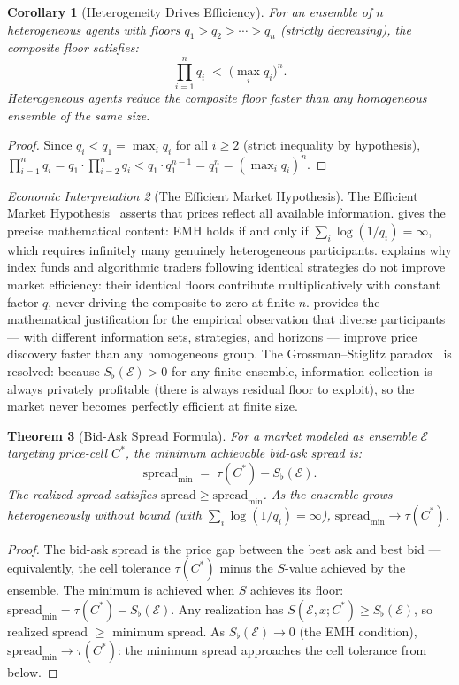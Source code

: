 \documentclass[twocolumn,11pt,a4paper]{article}
\newtheorem{theorem}{Theorem}[section]
\newtheorem{corollary}[theorem]{Corollary}
\theoremstyle{remark}
\newtheorem{econinterp}[theorem]{Economic Interpretation}
\newcommand{\Sflat}{S_{\flat}}
\newcommand{\tol}{\tau}
\newcommand{\Ens}{\mathcal{E}}            %
\begin{document}
\begin{corollary}[Heterogeneity Drives Efficiency]
\label{cor:heterogeneity-efficiency}
For an ensemble of $n$ heterogeneous agents with floors $q_1 > q_2 > \cdots
> q_n$ (strictly decreasing), the composite floor satisfies:
\[
  \prod_{i=1}^n q_i \;<\; \bigl(\max_i q_i\bigr)^n.
\]
Heterogeneous agents reduce the composite floor faster than any homogeneous
ensemble of the same size.
\end{corollary}
\begin{proof}
Since $q_i < q_1 = \max_i q_i$ for all $i \ge 2$ (strict inequality by
hypothesis), $\prod_{i=1}^n q_i = q_1 \cdot \prod_{i=2}^n q_i <
q_1 \cdot q_1^{n-1} = q_1^n = (\max_i q_i)^n$.
\end{proof}

\begin{econinterp}[The Efficient Market Hypothesis]
\label{ei:emh}
The Efficient Market Hypothesis~\cite{fama1970} asserts that prices reflect
all available information.   gives the precise mathematical
content: EMH holds if and only if $\sum_i \log(1/q_i) = \infty$, which
requires infinitely many genuinely heterogeneous participants.
 explains why index funds and algorithmic traders
following identical strategies do not improve market efficiency: their
identical floors contribute multiplicatively with constant factor $q$, never
driving the composite to zero at finite $n$.
 provides the mathematical justification
for the empirical observation that diverse participants — with different
information sets, strategies, and horizons — improve price discovery
faster than any homogeneous group.  The Grossman--Stiglitz
paradox~\cite{grossmanstiglitz1980} is resolved: because $\Sflat(\Ens) > 0$
for any finite ensemble, information collection is always privately
profitable (there is always residual floor to exploit), so the market never
becomes perfectly efficient at finite size.
\end{econinterp}

\begin{theorem}[Bid-Ask Spread Formula]
\label{thm:spread}
For a market modeled as ensemble $\Ens$ targeting price-cell $C^*$, the
minimum achievable bid-ask spread is:
\[
  \mathrm{spread}_{\min} \;=\; \tol(C^*) - \Sflat(\Ens).
\]
The realized spread satisfies $\mathrm{spread} \ge \mathrm{spread}_{\min}$.
As the ensemble grows heterogeneously without bound (with $\sum_i \log(1/q_i)
= \infty$), $\mathrm{spread}_{\min} \to \tol(C^*)$.
\end{theorem}
\begin{proof}
The bid-ask spread is the price gap between the best ask and best bid —
equivalently, the cell tolerance $\tol(C^*)$ minus the $S$-value achieved
by the ensemble.  The minimum is achieved when $S$ achieves its floor:
$\mathrm{spread}_{\min} = \tol(C^*) - \Sflat(\Ens)$.  Any realization has
$S(\Ens, x; C^*) \ge \Sflat(\Ens)$, so realized spread $\ge$ minimum spread.
As $\Sflat(\Ens) \to 0$ (the EMH condition), $\mathrm{spread}_{\min} \to
\tol(C^*)$: the minimum spread approaches the cell tolerance from below.
\end{proof}
\end{document}
